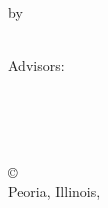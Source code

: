 \pagestyle{empty}

\begin{titlepage}
        \begin{center}
        \vspace*{1.0cm}

        \Huge
        {\bf \thesistitlecoverpage }

        \vspace*{1.0cm}

        \normalsize
        by \\

        \vspace*{1.0cm}

        \Large
        \thesisauthor\\
        Advisors:~\advisor\\

        \vspace*{3.0cm}


        \vspace*{2.0cm}

        \nameofprogram\\
        \academicunit\\
        \nameOfUniversity\\

        \vspace*{4.0cm}

        \copyright~\thesisauthor\\Peoria, Illinois, \graduationyear\\
        \end{center}
\end{titlepage}


\pagestyle{plain}
\setcounter{page}{2}

\cleardoublepage %



